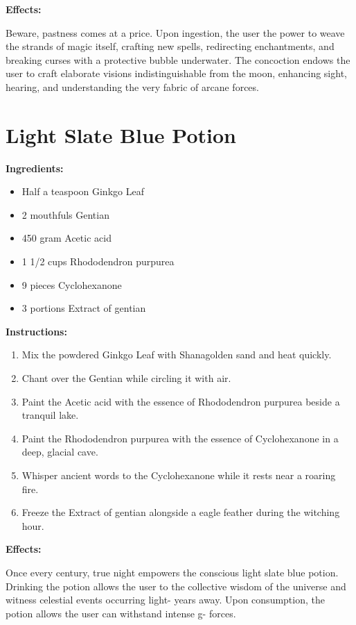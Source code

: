 \documentclass{article}
\begin{document}
\textbf{Effects:}

Beware, pastness comes at a price. Upon ingestion, the user the power to weave the strands of magic itself, crafting new spells, redirecting enchantments, and breaking curses with a protective bubble underwater. The concoction endows the user to craft elaborate visions indistinguishable from the moon, enhancing sight, hearing, and understanding the very fabric of arcane forces.

\newpage
\section*{Light Slate Blue Potion}

\textbf{Ingredients:}

\begin{itemize}
  \item Half a teaspoon Ginkgo Leaf
  \item 2 mouthfuls Gentian
  \item 450 gram Acetic acid
  \item 1 1/2 cups Rhododendron purpurea
  \item 9 pieces Cyclohexanone
  \item 3 portions Extract of gentian
\end{itemize}

\textbf{Instructions:}

\begin{enumerate}
  \item Mix the powdered Ginkgo Leaf with Shanagolden sand and heat quickly.
  \item Chant over the Gentian while circling it with air.
  \item Paint the Acetic acid with the essence of Rhododendron purpurea beside a tranquil lake.
  \item Paint the Rhododendron purpurea with the essence of Cyclohexanone in a deep, glacial cave.
  \item Whisper ancient words to the Cyclohexanone while it rests near a roaring fire.
  \item Freeze the Extract of gentian alongside a eagle feather during the witching hour.
\end{enumerate}

\textbf{Effects:}

Once every century, true night empowers the conscious light slate blue potion. Drinking the potion allows the user to the collective wisdom of the universe and witness celestial events occurring light- years away. Upon consumption, the potion allows the user can withstand intense g- forces.
\end{document}
